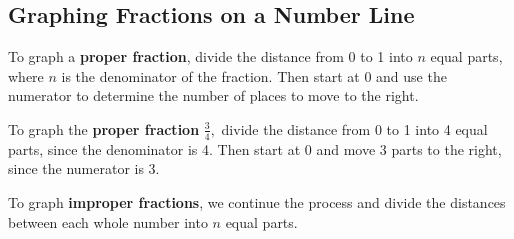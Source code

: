 \documentclass[handout, font=12pt]{ximera}
\begin{document}
\subsection*{Graphing Fractions on a Number Line}

To graph a \textbf{proper fraction}, divide the distance from 0 to 1 into $n$ equal parts, where $n$ is the denominator of the fraction.  Then start at 0 and use the numerator to determine the number of places to move to the right.

\begin{example}

To graph the \textbf{proper fraction} $\textstyle \frac{3} {4},$ divide the distance from 0 to 1 into 4 equal parts, since the denominator is 4. Then 
start at 0 and move 3 parts to the right, since the numerator is 3.

\begin{center}

\end{center}
\end{example}

To graph \textbf{improper fractions}, we continue the process and divide the distances between each whole number into $n$ equal parts.
\end{document}
